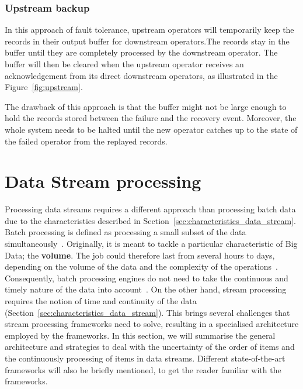 \subsubsection{Upstream backup}

In this approach of fault tolerance, upstream operators 
will temporarily 
keep the records in their output buffer for downstream operators.The records 
stay in the buffer until they are completely processed by the downstream operator. 
The buffer will then be cleared when the upstream operator receives 
an acknowledgement from its direct downstream operators, as illustrated in the Figure~\ref{fig:upstream}. 

The drawback of this approach is that the buffer might not be large enough to 
hold the records stored between the failure and the recovery event. Moreover, 
the whole system needs to be halted until the new operator catches up to 
the state of the failed operator from the replayed records. 

\section{Data Stream processing}

Processing data streams requires a different approach than processing batch data due 
to the characteristics described in Section~\ref{sec:characteristics_data_stream}. 
Batch processing is defined as processing a small subset of the data simultaneously~\cite{batch_processing}. 
Originally, it is meant to tackle a particular characteristic of Big Data; the \textbf{volume}. The job 
could therefore last from several hours to days, depending on the volume of the data and the 
complexity of the operations~\cite{batch_duration}.
Consequently, batch processing engines do not need to take the continuous and 
timely nature of the data into account~\cite{flink}.
On the other hand, stream processing requires the notion of time and continuity of the data 
(Section~\ref{sec:characteristics_data_stream}). This brings several challenges 
that stream processing frameworks need to solve, resulting in a specialised architecture employed by the 
frameworks. In this section, we will summarise the general architecture and strategies to deal with the 
uncertainty of the order of items and the continuously processing of items in data streams. Different 
state-of-the-art frameworks will also be briefly mentioned, to get the reader familiar with the 
frameworks. 

\newpage


